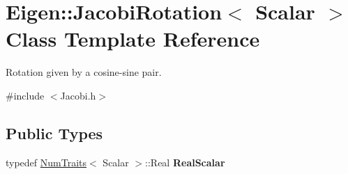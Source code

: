 \hypertarget{class_eigen_1_1_jacobi_rotation}{}\section{Eigen\+::Jacobi\+Rotation$<$ Scalar $>$ Class Template Reference}
\label{class_eigen_1_1_jacobi_rotation}


Rotation given by a cosine-\/sine pair.  




{\ttfamily \#include $<$Jacobi.\+h$>$}

\subsection*{Public Types}
\begin{DoxyCompactItemize}
\item 
\mbox{\label{class_eigen_1_1_jacobi_rotation_a8d15e6a99740aecb64b3c639e8fb2856}} 
typedef \mbox{\hyperlink{struct_eigen_1_1_num_traits}{Num\+Traits}}$<$ Scalar $>$\+::Real {\bfseries Real\+Scalar}
\end{DoxyCompactItemize}
